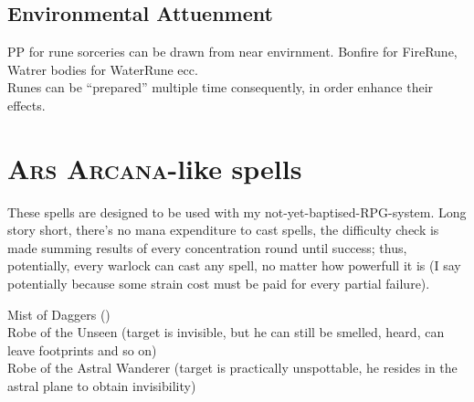\documentclass[10pt,a4paper]{article}
\begin{document}
\subsection{Environmental Attuenment}
PP for rune sorceries can be drawn from near envirnment. Bonfire for FireRune, Watrer bodies for WaterRune ecc.\\
Runes can be  ``prepared'' multiple time consequently, in order enhance their effects.



\section{\textsc{Ars Arcana}-like spells}
These spells are designed to be used with my not-yet-baptised-RPG-system. Long story short, there's no mana expenditure to cast spells, the difficulty check is made summing results of every concentration round until success; thus, potentially, every warlock can cast any spell, no matter how powerfull it is (I say potentially because some strain cost must be paid for every partial failure).

Mist of Daggers ()\\
Robe of the Unseen (target is invisible, but he can still be smelled, heard, can leave footprints and so on)\\
Robe of the Astral Wanderer (target is practically unspottable, he resides in the astral plane to obtain invisibility)
\end{document}
